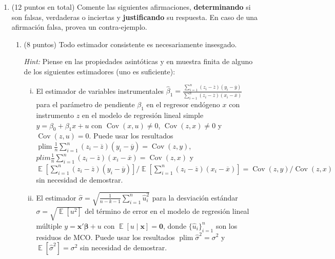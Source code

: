 \documentclass[letterpaper,11pt]{article}
\DeclareMathOperator{\cov}{Cov}
\DeclareMathOperator{\Exp}{\mathbb{E}}
\newcommand{\E}[1]{\Exp\left[#1\right]}
\DeclareMathOperator{\plim}{plim}
\newcommand{\respuesta}{\color{blue}\paragraph{Respuesta.}}
\newcommand{\fin}{\color{black}}
\begin{document}
\begin{enumerate}
\respuesta El factor de inflación de la varianza es
\[
    VIF=\frac{1}{1-R^2_{Entrenamiento}}=\frac{1}{1-0{,}75}=4.
\]
La regla de decisión habitual indica multicolinealidad severa si $VIF>10$
(equivalentemente, $R^2_{aux}>0{,}90$); un $VIF>5$ es solo una señal de alerta
moderada. Como $4<10$, la afirmación es \textbf{falsa}: existe colinealidad
moderada, no severa.
\fin

    \item\color{black}  (12 puntos en total) Comente las siguientes afirmaciones, \textbf{determinando} si son falsas, verdaderas o inciertas y \textbf{justificando} su respuesta. En caso de una afirmación falsa, provea un contra-ejemplo.

    \begin{enumerate}
        
        \item  (8 puntos) Todo estimador consistente es necesariamente insesgado.

        \medskip
        \textit{Hint:}
        Piense en las propiedades asintóticas y en muestra finita de alguno de los siguientes estimadores (uno es suficiente):
        \begin{enumerate}[(i)]
        
        \item El estimador de variables instrumentales $\widehat \beta_1=\frac{\sum\limits_{i=1}^n\left(z_i - \overline z\right)\left(y_i - \overline y\right)}{\sum\limits_{i=1}^n\left(z_i - \overline z \right) \left(x_i - \overline x \right)}$
        para el parámetro de pendiente $\beta_1$ en el regresor endógeno $x$ con instrumento $z$ en el modelo de regresión lineal simple $y = \beta_0 + \beta_1 x + u$ con $\cov{\left( x, u \right)} \neq 0$, $\cov{\left( z, x \right)} \neq 0$ y $\cov{\left( z, u \right)} = 0$.
        Puede usar los resultados
        $\plim \frac{1}{n} \sum\limits_{i=1}^n \left(z_i - \overline z \right) \left(y_i - \overline y\right)=\cov{\left( z, y \right)}$,
        $plim\frac{1}{n}\sum\limits_{i=1}^n \left(z_i - \overline z \right) \left(x_i - \overline x \right)=\cov{\left( z, x \right)}$
        y
        $\E{\sum\limits_{i=1}^n\left(z_i - \overline z\right)\left(y_i - \overline y \right)} /\E{\sum\limits_{i=1}^n \left( z_i - \overline z \right)\left( x_i - \overline x \right)} =\cov{\left( z, y \right)}/\cov{\left( z, x \right)}$ sin necesidad de demostrar.
                
        \item El estimador
        $\widehat \sigma = \sqrt{\frac{1}{n - k - 1}\sum\limits_{i=1}^n\widehat u_i^2}$ para la desviación estándar $\sigma = \sqrt{\E{u^2}}$ del término de error en el modelo de regresión lineal múltiple $y = \boldsymbol{x}'\boldsymbol{\beta} + u$ con $\E{u \mid \boldsymbol{x}} = \boldsymbol{0}$, donde $\lbrace \widehat u_i \rbrace_{i=1}^n$ son los residuos de MCO.
        Puede usar los resultados $\plim \widehat \sigma^2 = \sigma^2$ y $\E{\widehat \sigma^2} = \sigma^2$ sin necesidad de demostrar.
                

\end{enumerate}
\end{enumerate}
\end{enumerate}
\end{document}
